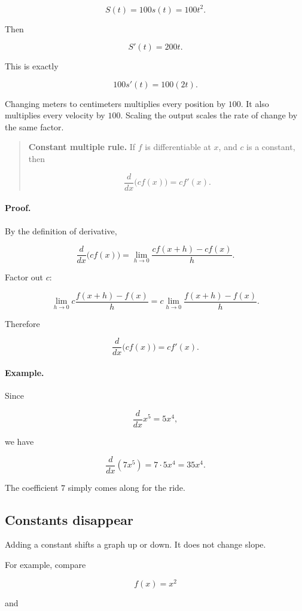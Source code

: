 \[
S(t)=100s(t)=100t^2.
\]

Then

\[
S'(t)=200t.
\]

This is exactly

\[
100s'(t)=100(2t).
\]

Changing meters to centimeters multiplies every position by \(100\).  It also multiplies every velocity by \(100\).  Scaling the output scales the rate of change by the same factor.

\begin{quote}
\textbf{Constant multiple rule.}
If \(f\) is differentiable at \(x\), and \(c\) is a constant, then

\[
\boxed{
\frac{d}{dx}\bigl(c f(x)\bigr)=c f'(x).
}
\]
\end{quote}

\paragraph{Proof.}
By the definition of derivative,

\[
\frac{d}{dx}\bigl(c f(x)\bigr)
=
\lim_{h\to0}\frac{c f(x+h)-c f(x)}{h}.
\]

Factor out \(c\):

\[
\lim_{h\to0}c\frac{f(x+h)-f(x)}{h}
=
c\lim_{h\to0}\frac{f(x+h)-f(x)}{h}.
\]

Therefore

\[
\frac{d}{dx}\bigl(c f(x)\bigr)=c f'(x).
\]

\paragraph{Example.}
Since

\[
\frac{d}{dx}x^5=5x^4,
\]

we have

\[
\frac{d}{dx}(7x^5)=7\cdot5x^4=35x^4.
\]

The coefficient \(7\) simply comes along for the ride.

\subsection{Constants disappear}
\label{subsec:constants-disappear-ch5}

Adding a constant shifts a graph up or down.  It does not change slope.

For example, compare

\[
f(x)=x^2
\]

and

